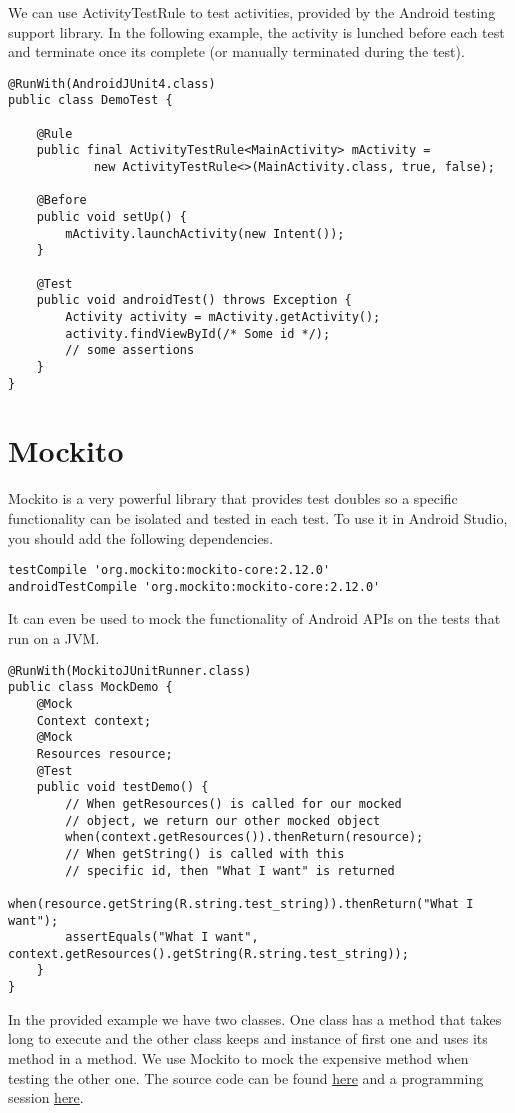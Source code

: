 We can use ActivityTestRule to test activities, provided by the Android testing support library. In the following example, the activity is lunched before each test and terminate once its complete (or manually terminated during the test).
\begin{lstlisting}[style=A_Java]
@RunWith(AndroidJUnit4.class)
public class DemoTest {
    
    @Rule
    public final ActivityTestRule<MainActivity> mActivity =
            new ActivityTestRule<>(MainActivity.class, true, false);

    @Before
    public void setUp() {
        mActivity.launchActivity(new Intent());
    }
    
    @Test
    public void androidTest() throws Exception {
        Activity activity = mActivity.getActivity();
        activity.findViewById(/* Some id */);
        // some assertions
    }
}
\end{lstlisting}

\section{Mockito}
Mockito is a very powerful library that provides test doubles so a specific functionality can be isolated and tested in each test. To use it in Android Studio, you should add the following dependencies.
\begin{lstlisting}[style=A_txt]
testCompile 'org.mockito:mockito-core:2.12.0'
androidTestCompile 'org.mockito:mockito-core:2.12.0'
\end{lstlisting}
It can even be used to mock the functionality of Android APIs on the tests that run on a JVM.
\begin{lstlisting}[style=A_Java]
@RunWith(MockitoJUnitRunner.class)
public class MockDemo {
    @Mock
    Context context;
    @Mock
    Resources resource;
    @Test
    public void testDemo() {
        // When getResources() is called for our mocked 
        // object, we return our other mocked object
        when(context.getResources()).thenReturn(resource);
        // When getString() is called with this 
        // specific id, then "What I want" is returned
        when(resource.getString(R.string.test_string)).thenReturn("What I want");
        assertEquals("What I want", context.getResources().getString(R.string.test_string));
    }
}
\end{lstlisting}
In the provided example we have two classes. One class has a method that takes long to execute and the other class keeps and instance of first one and uses its method in a method. We use Mockito to mock the expensive method when testing the other one. The source code can be found \href{https://github.com/JonSteinn/AndroidDevelopment/tree/master/examples/lab6/mocktest}{here} and a programming session \href{https://www.youtube.com/watch?v=AFCe_xwfR8g}{here}.

